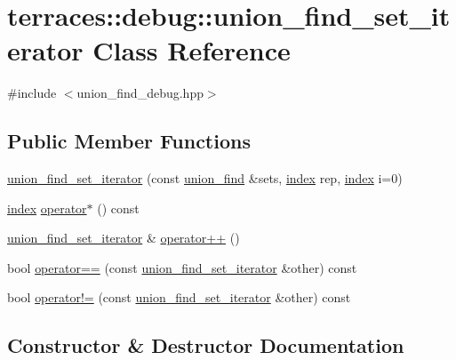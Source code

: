 \hypertarget{classterraces_1_1debug_1_1union__find__set__iterator}{}\section{terraces\+:\+:debug\+:\+:union\+\_\+find\+\_\+set\+\_\+iterator Class Reference}
\label{classterraces_1_1debug_1_1union__find__set__iterator}


{\ttfamily \#include $<$union\+\_\+find\+\_\+debug.\+hpp$>$}

\subsection*{Public Member Functions}
\begin{DoxyCompactItemize}
\item 
\hyperlink{classterraces_1_1debug_1_1union__find__set__iterator_a300b0f5389ab5c23ff8c050655be1b44}{union\+\_\+find\+\_\+set\+\_\+iterator} (const \hyperlink{classterraces_1_1union__find}{union\+\_\+find} \&sets, \hyperlink{namespaceterraces_adbc33ccb543d1634e96d0eb02e472c77}{index} rep, \hyperlink{namespaceterraces_adbc33ccb543d1634e96d0eb02e472c77}{index} i=0)
\item 
\hyperlink{namespaceterraces_adbc33ccb543d1634e96d0eb02e472c77}{index} \hyperlink{classterraces_1_1debug_1_1union__find__set__iterator_a322afd0866fa7b3e670950cd4d85aa69}{operator$\ast$} () const
\item 
\hyperlink{classterraces_1_1debug_1_1union__find__set__iterator}{union\+\_\+find\+\_\+set\+\_\+iterator} \& \hyperlink{classterraces_1_1debug_1_1union__find__set__iterator_a99ac5c002ced436bf701e289338dc101}{operator++} ()
\item 
bool \hyperlink{classterraces_1_1debug_1_1union__find__set__iterator_aa78c12fe312fe778ba56354458bee4bb}{operator==} (const \hyperlink{classterraces_1_1debug_1_1union__find__set__iterator}{union\+\_\+find\+\_\+set\+\_\+iterator} \&other) const
\item 
bool \hyperlink{classterraces_1_1debug_1_1union__find__set__iterator_a586be5d74ee3afe573cb591879e49010}{operator!=} (const \hyperlink{classterraces_1_1debug_1_1union__find__set__iterator}{union\+\_\+find\+\_\+set\+\_\+iterator} \&other) const
\end{DoxyCompactItemize}


\subsection{Constructor \& Destructor Documentation}
\mbox{\label{classterraces_1_1debug_1_1union__find__set__iterator_a300b0f5389ab5c23ff8c050655be1b44}} 

